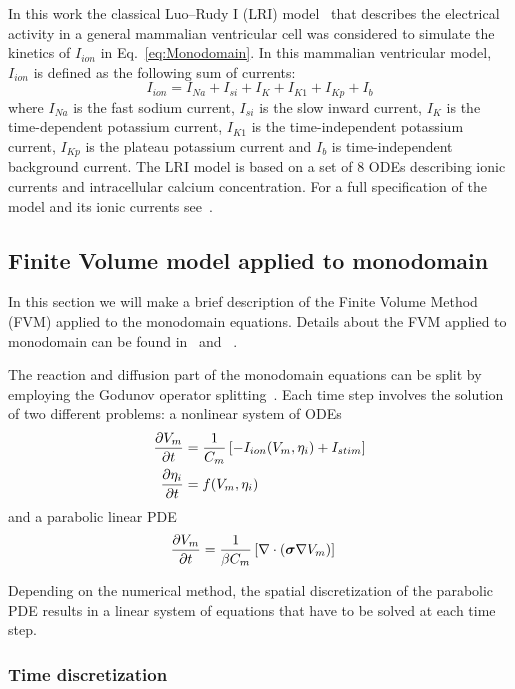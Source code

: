 In this work the classical Luo--Rudy I (LRI) model~\cite{Luo1991} that describes the
electrical activity in a general mammalian ventricular cell was considered to
simulate the kinetics of $I_{ion}$ in Eq.~\eqref{eq:Monodomain}. In this
mammalian ventricular model, $I_{ion}$ is defined as the following sum of
currents:
\begin{equation}
   I_{ion} = I_{Na} + I_{si} + I_{K} + I_{K1} + I_{Kp} + I_{b}
   \label{eq:LRDI}
\end{equation}
where $I_{Na}$ is the fast sodium current, $I_{si}$ is the slow inward current,
$I_{K}$ is the time-dependent potassium current, $I_{K1}$ is the
time-independent potassium current, $I_{Kp}$ is the plateau potassium current
and $I_{b}$ is time-independent background current. The LRI model is based on a
set of 8 ODEs describing ionic currents and intracellular calcium concentration.
For a full specification of the model and its ionic currents see~\cite{Luo1991}.

\subsection{Finite Volume model applied to monodomain}

In this section we will make a brief description of the Finite Volume Method (FVM) applied to the
monodomain equations. Details about the FVM applied to monodomain can be found
in~\cite{harrild1997finite} and ~\cite{coudiere20092d}.

The reaction and diffusion part of the monodomain equations can be split by
employing the Godunov operator splitting~\cite{Sundnes2006Book}. Each time step involves the solution of two different problems: a nonlinear system of ODEs
\begin{align}
  \displaystyle\frac{\partial V_m}{\partial t} &= \frac{1}{C_m} \left[ - I_{ion} (V_m,\eta_i) + I_{stim} \right]
  \label{eq:Step1a} \\
  \displaystyle\frac{\partial \eta_i}{\partial t} &= f(V_m, \eta_i) \label{eq:Step1b}
\end{align}
 and a parabolic linear PDE
\begin{align}
  \displaystyle\frac{\partial V_m}{\partial t} &= \frac{1}{\beta C_m}
  \displaystyle\left[ \nabla \cdot (\boldsymbol{\sigma} \nabla V_m) \right]
  \label{eq:Step2}
 \end{align}

Depending on the numerical method, the spatial discretization
of the parabolic PDE results in a linear system of equations
that have to be solved at each time step.

\subsubsection{Time discretization}

